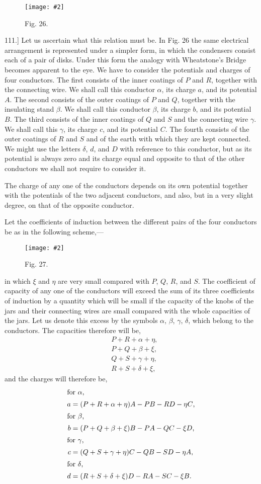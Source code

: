 \documentclass[12pt,oneside]{book}[2021/10/04]
\newcommand{\Runhead}[1]{\fancyhead[C]{\iffloatpage{}{\small#1}}}
\newcommand{\article}[1]{\phantomsection \label{art:#1}{#1.]}}
\newcommand{\widefig}[3]{
\begin{figure}[ht!]
\centering
\texttt{[image: \#2]}
\caption*{\small #3}
\end{figure}}
\newcommand{\¬}{\hphantom{0}}
\begin{document}
\widefig{0.57}{110_1.png}{Fig. 26.}
\article{111} Let us ascertain what this relation must be. In Fig. 26
the same electrical arrangement is represented under a simpler
form, in which the condensers consist each of a pair of disks.
Under this form the analogy with Wheatstone's Bridge becomes
apparent to the eye. We have to consider the potentials and
charges of four conductors. The first consists of the inner coatings
of \(P\) and \(R\), together with the connecting wire. We shall call this
conductor \(\alpha\), its charge \(a\), and its potential \(A\). The second consists
of the outer coatings of \(P\) and \(Q\), together with the insulating stand
\(\beta\). We shall call this conductor \(\beta\), its charge \(b\), and its potential
\(B\). The third consists of the inner coatings of \(Q\) and \(S\) and the
connecting wire \(\gamma\). We shall call this \(\gamma\), its charge \(c\), and its
potential \(C\). The fourth consists of the outer coatings of \(R\) and \(S\)
and of the earth with which they are kept connected. We might
use the letters \(\delta\), \(d\), and \(D\) with reference to this conductor, but as
its potential is always zero and its charge equal and opposite to
that of the other conductors we shall not require to consider it.

The charge of any one of the conductors depends on its own
potential together with the potentials of the two adjacent conductors,
and also, but in a very slight degree, on that of the opposite
conductor.

Let the coefficients of induction between the different pairs of
the four conductors be as in the following scheme,---
\Runhead{COMPARISON OF CONDENSERS.}

\widefig{0.45}{111.png}{Fig. 27.}
\noindent in which \(\xi\) and \(\eta\) are very small compared with \(P\), \(Q\), \(R\), and \(S\).
The coefficient of capacity of any one of the conductors will exceed
the sum of its three coefficients of induction by a quantity which
will be small if the capacity of the knobs of the jars and their
connecting wires are small compared with the whole capacities of
the jars. Let us denote this excess by the symbols \(\alpha\), \(\beta\), \(\gamma\), \(\delta\), which
belong to the conductors. The capacities therefore will be,
\begin{align*}
&P + R + \alpha + \eta\text{,}\\
&P + Q + \beta + \xi\text{,}\\
&Q + S + \gamma + \eta\text{,}\\
&R + S + \delta + \xi\text{,}
\end{align*}
and the charges will therefore be,
\begin{align*}
\shortintertext{for \(\alpha\),}
a &= (P+R+\alpha+\eta)A-PB-RD-\eta C\text{,}\\
\shortintertext{for \(\beta\),}
b &= (P+Q+\beta+\xi)B-PA-QC-\xi D\text{,}\\
\shortintertext{for \(\gamma\),}
c &= (Q+S+\gamma+\eta)C-QB-SD-\eta A\text{,}\\
\shortintertext{for \(\delta\),}
d &= (R+S+\delta+\xi)D-RA-SC-\xi B\text{.}
\end{align*}
\end{document}
